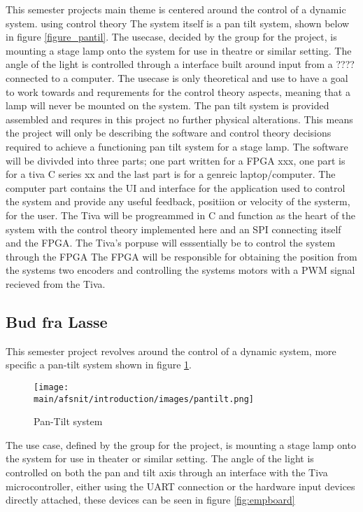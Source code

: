\documentclass[../../main]{subfiles}
\begin{document}
This semester projects main theme is centered around the control of a dynamic system. using control theory The system itself is a pan tilt system, shown below in figure \ref{figure_pantil}. The usecase, decided by the group for the project, is mounting a stage lamp onto the system for use in theatre or similar setting. The angle of the light is controlled through a interface built around input from a ???? connected to a computer. The usecase is only theoretical and use to have a goal to work towards and requrements for the control theory aspects, meaning that a lamp will never be mounted on the system. The pan tilt system is provided assembled and requres in this project no further physical alterations. This means the project will only be describing the software and control theory decisions required to achieve a functioning pan tilt system for a stage lamp. The software will be divivded into three parts; one part written for a  FPGA xxx, one part is for a tiva C series xx and the last part is for a genreic laptop/computer. The computer part contains the UI and interface for the application used to control the system and provide any useful feedback, positiion or velocity of the systerm, for the user. The Tiva will be progreammed in C and function as the heart of the system with the control theory implemented here and an SPI connecting  itself and the FPGA. The Tiva's porpuse will esssentially be to control the system through the FPGA The FPGA will be responsible for obtaining the position from the systems two encoders and controlling the systems motors with a PWM signal recieved from the Tiva. 

\subsection*{Bud fra Lasse}

This semester project revolves around the control of a dynamic system, more specific a pan-tilt  system shown in figure \ref{fig:system}.

\begin{figure}[H]
\centering
\texttt{[image: \\main/afsnit/introduction/images/pantilt.png]}
\caption{Pan-Tilt system}
\label{fig:system}
\end{figure}

The use case, defined by the group for the project, is mounting a stage lamp onto the system for use in theater or similar setting.
The angle of the light is controlled on both the pan and tilt axis through an interface with the Tiva microcontroller, either using the UART connection or the hardware input devices directly attached, these devices can be seen in figure \ref{fig:empboard}  
\end{document}
